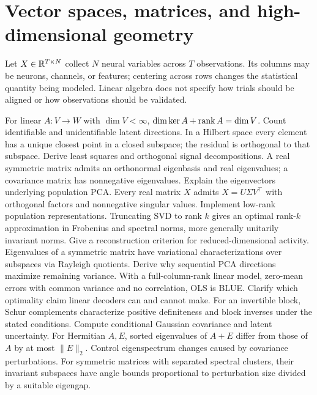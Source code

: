 \chapter[Linear algebra and geometry]{Vector spaces, matrices, and high-dimensional geometry}
Let $X\in\mathbb{R}^{T\times N}$ collect $N$ neural variables across $T$
observations. Its columns may be neurons, channels, or features;
centering across rows changes the statistical quantity being modeled.
Linear algebra does not specify how trials should be aligned or how
observations should be validated.

{For linear $A:V\to W$ with $\dim V<\infty$,
$\dim\ker A+\operatorname{rank} A=\dim V$.}
{Count identifiable and unidentifiable latent directions.}
{In a Hilbert space every element has a unique closest
point in a closed subspace; the residual is orthogonal to that subspace.}
{Derive least squares and orthogonal signal decompositions.}
{A real symmetric matrix admits an orthonormal eigenbasis and real
eigenvalues; a covariance matrix has nonnegative eigenvalues.}
{Explain the eigenvectors underlying population PCA.}
{Every real matrix $X$ admits $X=U\Sigma V^\top$
with orthogonal factors and nonnegative singular values.}
{Implement low-rank population representations.}
{Truncating SVD to rank $k$ gives an optimal rank-$k$ approximation
in Frobenius and spectral norms, more generally unitarily invariant norms.}
{Give a reconstruction criterion for reduced-dimensional activity.}
{Eigenvalues of a symmetric matrix have variational characterizations
over subspaces via Rayleigh quotients.}
{Derive why sequential PCA directions maximize remaining variance.}
{With a full-column-rank linear model, zero-mean errors
with common variance and no correlation, OLS is BLUE.}
{Clarify which optimality claim linear decoders can and cannot make.}
{For an invertible block, Schur complements characterize
positive definiteness and block inverses under the stated conditions.}
{Compute conditional Gaussian covariance and latent uncertainty.}
{For Hermitian $A,E$, sorted eigenvalues of $A+E$ differ
from those of $A$ by at most $\|E\|_2$.}
{Control eigenspectrum changes caused by covariance perturbations.}
{For symmetric matrices with separated spectral clusters,
their invariant subspaces have angle bounds proportional
to perturbation size divided by a suitable eigengap.}
